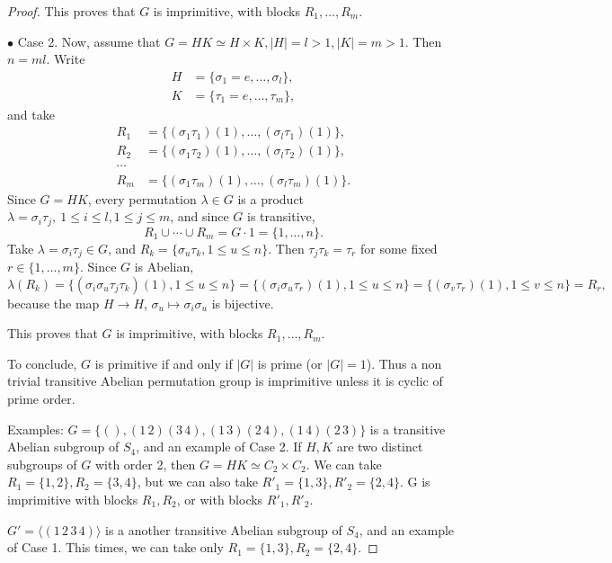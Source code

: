 \documentclass[11pt,a4paper]{article}
\begin{document}
\begin{proof}
This proves that $G$ is imprimitive, with blocks $R_1,\ldots,R_m$.

\bigskip

$\bullet$ Case 2. Now, assume that $G = HK \simeq H \times K, |H| = l>1, |K| = m>1$. Then $n = ml$. Write
\begin{align*}
H &= \{\sigma_1 =e,\ldots,\sigma_l\},\\
K &= \{\tau_1 = e,\ldots,\tau_m\},
\end{align*}
and take
\begin{align*}
R_1 &=\{ (\sigma_1 \tau_1)(1), \ldots, (\sigma_l \tau_1)(1) \},\\
R_2 &=\{ (\sigma_1 \tau_2)(1),\ldots, (\sigma_l \tau_2)(1)\},\\
\cdots\\
R_m&= \{ (\sigma_1 \tau_m)(1), \ldots, (\sigma_l \tau_m)(1)\}.
\end{align*}
Since $G = HK$, every permutation $\lambda \in G$ is a product $\lambda = \sigma_i \tau_j,\ 1\leq i\leq l, 1 \leq j \leq m$, and since $G$ is transitive,
$$R_1 \cup \cdots \cup R_m = G\cdot 1 = \{1,\ldots,n\}.$$
Take $\lambda = \sigma_i \tau_j \in G$, and $R_k = \{\sigma_u \tau_k, 1\leq u \leq n\}$. Then $\tau_j \tau_k = \tau_r$ for some fixed $r \in \{1,\ldots,m\}$. Since $G$ is Abelian,
$$\lambda(R_k) = \{(\sigma_i \sigma_u \tau_j \tau_k)(1) , 1 \leq u \leq n\} = \{(\sigma_i \sigma_u \tau_r)(1) , 1 \leq u \leq n\} =  \{(\sigma_v \tau_r)(1) , 1 \leq v \leq n\} = R_r,$$
because the map $H \to H$, $\sigma_u \mapsto \sigma_i \sigma_u$ is bijective.

This proves that $G$ is imprimitive, with blocks $R_1,\ldots,R_m$. 

To conclude, $G$ is primitive if and only if $|G|$ is prime (or $|G| = 1$). Thus a non trivial transitive Abelian permutation group is imprimitive unless it is cyclic of prime order.

\bigskip

Examples: $G = \{(), (1\,2)(3\,4), (1\,3)(2\,4),(1\,4)(2\,3)\}$ is a transitive Abelian subgroup of $S_4$, and an example of Case 2. If $H, K$ are two distinct subgroups of $G$ with order 2, then $G = HK \simeq C_2 \times C_2$. We can take $R_1 = \{1,2\}, R_2 = \{3,4\}$, but we can also take $R'_1 = \{1,3\},R'_2 = \{2,4\}$. G is imprimitive with blocks $R_1,R_2$, or with blocks $R'_1,R'_2$.

$G' = \langle (1\,2\,3\,4) \rangle$ is a another transitive Abelian subgroup of $S_4$, and an example of Case 1. This times, we can take only $R_1 = \{1,3\},R_2 = \{2,4\}$.
\end{proof}
\end{document}
